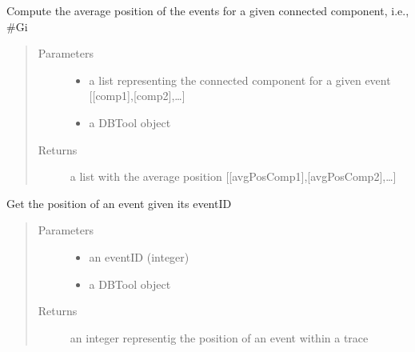 \documentclass[letterpaper,10pt,english]{sphinxmanual}
\begin{document}

\begin{fulllineitems}
\label{\detokenize{refinement:refinement.labelRefinement.averagePosition}}
Compute the average position of the events for a given connected component, i.e., \#Gi
\begin{quote}\begin{description}
\item[{Parameters}] \leavevmode\begin{itemize}
\item {} 
 \textendash{} a list representing the connected component for a given event {[}{[}comp1{]},{[}comp2{]},…{]}

\item {} 
 \textendash{} a DBTool object

\end{itemize}

\item[{Returns}] \leavevmode
a list with the average position {[}{[}avgPosComp1{]},{[}avgPosComp2{]},…{]}

\end{description}\end{quote}

\end{fulllineitems}


\begin{fulllineitems}
\label{\detokenize{refinement:refinement.labelRefinement.getPosition}}
Get the position of an event given its eventID
\begin{quote}\begin{description}
\item[{Parameters}] \leavevmode\begin{itemize}
\item {} 
 \textendash{} an eventID (integer)

\item {} 
 \textendash{} a DBTool object

\end{itemize}

\item[{Returns}] \leavevmode
an integer representig the position of an event within a trace

\end{description}\end{quote}

\end{fulllineitems}
\end{document}
